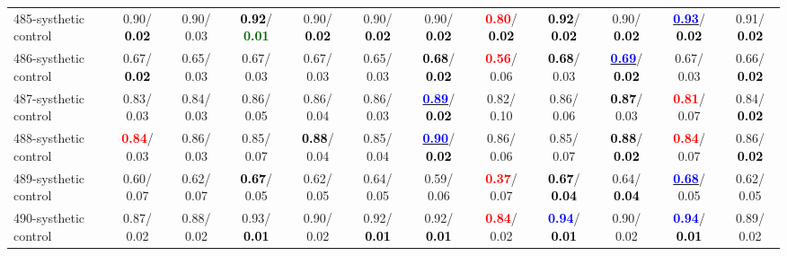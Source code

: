 \begin{table}[h]
\begin{center}
{\begin{tabular}{lc|c|c|c|c|c|c|c|c|c|c}
485-systhetic control &   0.90/\textcolor{black}{\textbf{  0.02}} &   0.90/  0.03 & \textcolor{black}{\textbf{  0.92}}/\textcolor{darkgreen}{\textbf{  0.01}} &   0.90/\textcolor{black}{\textbf{  0.02}} &   0.90/\textcolor{black}{\textbf{  0.02}} &   0.90/\textcolor{black}{\textbf{  0.02}} & \textcolor{red}{\textbf{  0.80}}/\textcolor{black}{\textbf{  0.02}} & \textcolor{black}{\textbf{  0.92}}/\textcolor{black}{\textbf{  0.02}} &   0.90/\textcolor{black}{\textbf{  0.02}} & \underline{\textcolor{blue}{\textbf{  0.93}}}/\textcolor{black}{\textbf{  0.02}} &   0.91/\textcolor{black}{\textbf{  0.02}} \\
486-systhetic control &   0.67/\textcolor{black}{\textbf{  0.02}} &   0.65/  0.03 &   0.67/  0.03 &   0.67/  0.03 &   0.65/  0.03 & \textcolor{black}{\textbf{  0.68}}/\textcolor{black}{\textbf{  0.02}} & \textcolor{red}{\textbf{  0.56}}/  0.06 & \textcolor{black}{\textbf{  0.68}}/  0.03 & \underline{\textcolor{blue}{\textbf{  0.69}}}/\textcolor{black}{\textbf{  0.02}} &   0.67/  0.03 &   0.66/\textcolor{black}{\textbf{  0.02}} \\
487-systhetic control &   0.83/  0.03 &   0.84/  0.03 &   0.86/  0.05 &   0.86/  0.04 &   0.86/  0.03 & \underline{\textcolor{blue}{\textbf{  0.89}}}/\textcolor{black}{\textbf{  0.02}} &   0.82/  0.10 &   0.86/  0.06 & \textcolor{black}{\textbf{  0.87}}/  0.03 & \textcolor{red}{\textbf{  0.81}}/  0.07 &   0.84/\textcolor{black}{\textbf{  0.02}} \\ \hline
488-systhetic control & \textcolor{red}{\textbf{  0.84}}/  0.03 &   0.86/  0.03 &   0.85/  0.07 & \textcolor{black}{\textbf{  0.88}}/  0.04 &   0.85/  0.04 & \underline{\textcolor{blue}{\textbf{  0.90}}}/\textcolor{black}{\textbf{  0.02}} &   0.86/  0.06 &   0.85/  0.07 & \textcolor{black}{\textbf{  0.88}}/\textcolor{black}{\textbf{  0.02}} & \textcolor{red}{\textbf{  0.84}}/  0.07 &   0.86/\textcolor{black}{\textbf{  0.02}} \\
489-systhetic control &   0.60/  0.07 &   0.62/  0.07 & \textcolor{black}{\textbf{  0.67}}/  0.05 &   0.62/  0.05 &   0.64/  0.05 &   0.59/  0.06 & \textcolor{red}{\textbf{  0.37}}/  0.07 & \textcolor{black}{\textbf{  0.67}}/\textcolor{black}{\textbf{  0.04}} &   0.64/\textcolor{black}{\textbf{  0.04}} & \underline{\textcolor{blue}{\textbf{  0.68}}}/  0.05 &   0.62/  0.05 \\
490-systhetic control &   0.87/  0.02 &   0.88/  0.02 &   0.93/\textcolor{black}{\textbf{  0.01}} &   0.90/  0.02 &   0.92/\textcolor{black}{\textbf{  0.01}} &   0.92/\textcolor{black}{\textbf{  0.01}} & \textcolor{red}{\textbf{  0.84}}/  0.02 & \textcolor{blue}{\textbf{  0.94}}/\textcolor{black}{\textbf{  0.01}} &   0.90/  0.02 & \textcolor{blue}{\textbf{  0.94}}/\textcolor{black}{\textbf{  0.01}} &   0.89/  0.02 \\

\end{tabular}}
\end{center}
\end{table}
